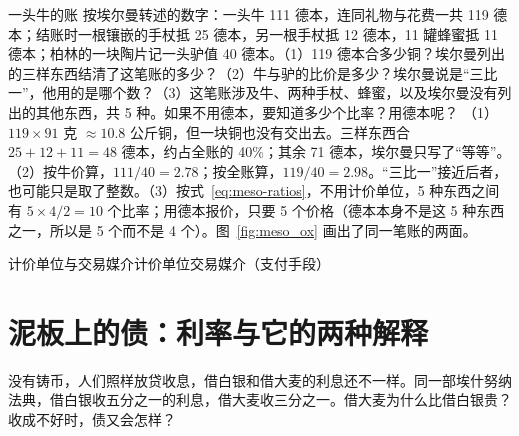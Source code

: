 \begin{example}{一头牛的账}\label{ex:meso-ox}
按埃尔曼转述的数字\cite{erman1894}：一头牛 111 德本，连同礼物与花费一共 119 德本；结账时一根镶嵌的手杖抵 25 德本，另一根手杖抵 12 德本，11 罐蜂蜜抵 11 德本；柏林的一块陶片记一头驴值 40 德本。（1）119 德本合多少铜？埃尔曼列出的三样东西结清了这笔账的多少？（2）牛与驴的比价是多少？埃尔曼说是“三比一”，他用的是哪个数？（3）这笔账涉及牛、两种手杖、蜂蜜，以及埃尔曼没有列出的其他东西，共 5 种。如果不用德本，要知道多少个比率？用德本呢？
\solution （1）$119\times91$ 克 $\approx10.8$ 公斤铜，但一块铜也没有交出去。三样东西合 $25+12+11=48$ 德本，约占全账的 40\%；其余 71 德本，埃尔曼只写了“等等”。（2）按牛价算，$111/40=2.78$；按全账算，$119/40=2.98$。“三比一”接近后者，也可能只是取了整数。（3）按式~\eqref{eq:meso-ratios}，不用计价单位，5 种东西之间有 $5\times4/2=10$ 个比率；用德本报价，只要 5 个价格（德本本身不是这 5 种东西之一，所以是 5 个而不是 4 个）。图~\ref{fig:meso_ox} 画出了同一笔账的两面。
\end{example}


\begin{compare}{计价单位与交易媒介}{计价单位}{交易媒介（支付手段）}
\end{compare}

\section{泥板上的债：利率与它的两种解释}\label{sec:meso-credit}

没有铸币，人们照样放贷收息，借白银和借大麦的利息还不一样。同一部埃什努纳法典，借白银收五分之一的利息，借大麦收三分之一。借大麦为什么比借白银贵？收成不好时，债又会怎样？

